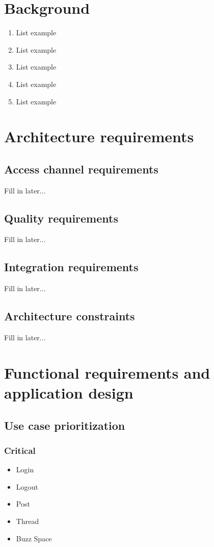\documentclass[12pt, oneside]{article}
\begin{document}
\section{Background}
	\begin{enumerate}
		\item List example
		\item List example
		\item List example
		\item List example
		\item List example
	\end{enumerate}
	
\section{Architecture requirements}
	\subsection{Access channel requirements}
		Fill in later...
	\subsection{Quality requirements}
		Fill in later...
	\subsection{Integration requirements}
		Fill in later...
	\subsection{Architecture constraints}
		Fill in later...
	
\section{Functional requirements and application design}
	\subsection{Use case prioritization}
		\subsubsection{Critical}
			\begin{itemize}
				\item Login
				\item Logout
				\item Post
				\item Thread
				\item Buzz Space
			 \end{itemize}
\end{document}

